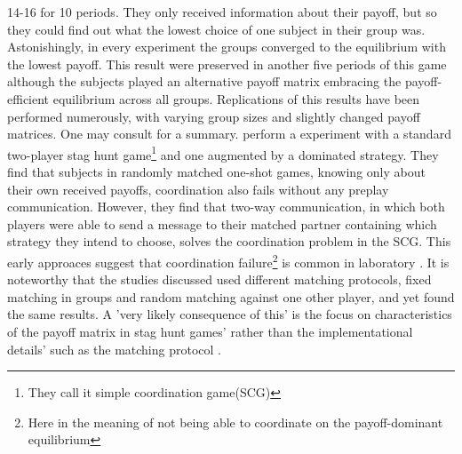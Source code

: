 \documentclass[11pt]{article}
\begin{document}
14-16 for 10 periods. They only received information about their payoff, but 
so they could find out what the lowest choice of one subject in their group was.
Astonishingly, in every experiment the groups converged
to the equilibrium with the lowest payoff. This result were preserved in another 
five periods of this game although the subjects played an alternative payoff
matrix embracing the payoff-efficient equilibrium across all groups. 
Replications of this results have been performed numerously, with varying group
sizes and slightly changed payoff matrices. One may consult \textcite{devetag_when_2007}
for a summary. 
\textcite{cooper_communication_1992} perform a experiment with a standard two-player stag
hunt game\footnote{They call it simple coordination game(SCG)} 
and one augmented by a dominated strategy. They find that 
subjects in randomly matched one-shot games, knowing only about their own
received payoffs, coordination also fails without any preplay communication. 
However, they find that two-way communication, in which both players were
able to send a message to their matched partner containing which strategy
they intend to choose, solves the coordination problem in the SCG. 
This early approaces suggest that coordination failure\footnote{Here in the 
meaning of not being able to coordinate on the payoff-dominant equilibrium} is
common in laboratory \parencite{devetag_when_2007}. It is noteworthy that the studies 
discussed used different matching protocols, fixed matching in groups and 
random matching against one other player, and yet found the same results. 
A 'very likely consequence of this' is the focus on characteristics of the
payoff matrix in stag hunt games' rather than the implementational details' 
such as the matching protocol \parencite{devetag_when_2007}.
\end{document}
